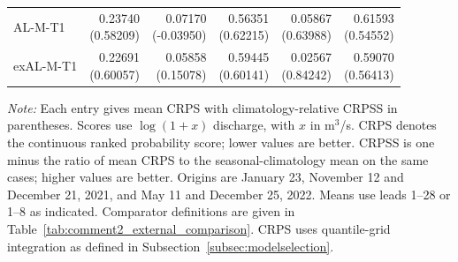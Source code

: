 \begin{table}[!htbp]
\begin{threeparttable}
\begin{tabular}{lrrrrr}
AL-M-T1 & \shortstack[r]{0.23740\\(0.58209)} & \shortstack[r]{0.07170\\(-0.03950)} & \shortstack[r]{0.56351\\(0.62215)} & \shortstack[r]{0.05867\\(0.63988)} & \shortstack[r]{0.61593\\(0.54552)} \\
exAL-M-T1 & \shortstack[r]{0.22691\\(0.60057)} & \shortstack[r]{0.05858\\(0.15078)} & \shortstack[r]{0.59445\\(0.60141)} & \shortstack[r]{0.02567\\(0.84242)} & \shortstack[r]{0.59070\\(0.56413)} \\
\hline
\end{tabular}
\begin{tablenotes}
\fontsize{8}{10}\selectfont
\item \textit{Note:} Each entry gives mean CRPS with climatology-relative CRPSS in parentheses. Scores use $\log(1+x)$ discharge, with $x$ in m$^3$/s. CRPS denotes the continuous ranked probability score; lower values are better. CRPSS is one minus the ratio of mean CRPS to the seasonal-climatology mean on the same cases; higher values are better. Origins are January 23, November 12 and December 21, 2021, and May 11 and December 25, 2022. Means use leads 1--28 or 1--8 as indicated. Comparator definitions are given in Table~\ref{tab:comment2_external_comparison}. CRPS uses quantile-grid integration as defined in Subsection~\ref{subsec:modelselection}.
\end{tablenotes}
\end{threeparttable}
\end{table}
